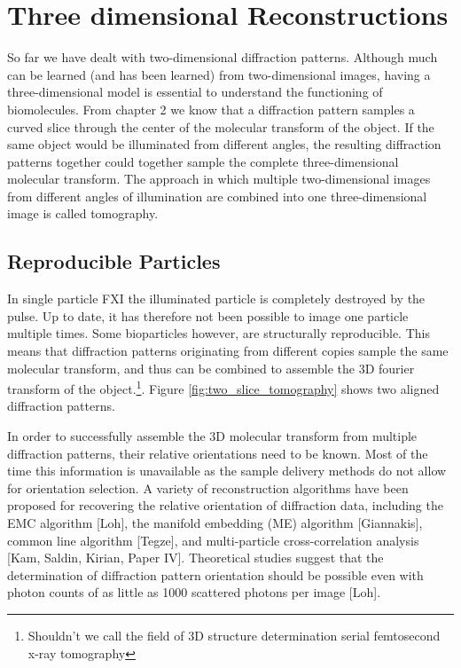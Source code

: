\chapter{Three dimensional Reconstructions}
So far we have dealt with two-dimensional diffraction patterns. Although much can be learned (and has been learned) from two-dimensional images, having a three-dimensional model is essential to understand the functioning of biomolecules. From chapter 2 we know that a diffraction pattern samples a curved slice through the center of the molecular transform of the object. If the same object would be illuminated from different angles, the resulting diffraction patterns together could together sample the complete three-dimensional molecular transform. The approach in which multiple two-dimensional images from different angles of illumination are combined into one three-dimensional image is called tomography.%

\section{Reproducible Particles}

In single particle FXI the illuminated particle is completely destroyed by the pulse. Up to date, it has therefore not been possible to image one particle multiple times. Some bioparticles however, are structurally reproducible. This means that diffraction patterns originating from different copies sample the same molecular transform, and thus can be combined to assemble the 3D fourier transform of the object.\footnote{Shouldn't we call the field of 3D structure determination serial femtosecond x-ray tomography}. Figure \ref{fig:two_slice_tomography} shows two aligned diffraction patterns. 

In order to successfully assemble the 3D molecular transform from multiple diffraction patterns, their relative orientations need to be known. Most of the time this information is unavailable as the sample delivery methods do not allow for orientation selection. A variety of reconstruction algorithms have been proposed for recovering the relative orientation of diffraction data, including the EMC algorithm [Loh], the manifold embedding (ME) algorithm [Giannakis], common line algorithm [Tegze], and multi-particle cross-correlation analysis [Kam, Saldin, Kirian, Paper IV]. Theoretical studies suggest that the determination of diffraction pattern orientation should be possible even with photon counts of as little as 1000 scattered photons per image [Loh].

